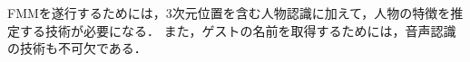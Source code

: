 \documentclass[a4j]{jarticle}
\begin{document}
FMMを遂行するためには，3次元位置を含む人物認識に加えて，人物の特徴を推定する技術が必要になる．
また，ゲストの名前を取得するためには，音声認識の技術も不可欠である．
\end{document}
